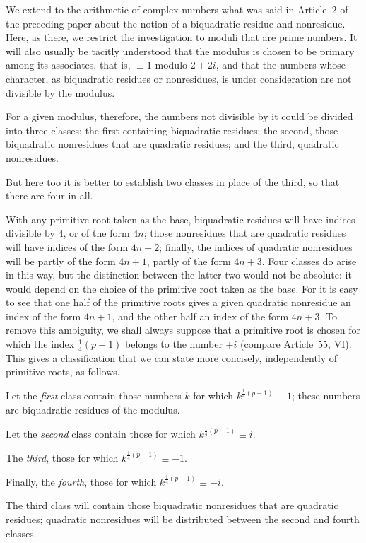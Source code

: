 \newpage
{}
We extend to the arithmetic of complex numbers what was said in Article~2 of the preceding paper about the notion of a biquadratic residue and nonresidue. Here, as there, we restrict the investigation to moduli that are prime numbers. It will also usually be tacitly understood that the modulus is chosen to be primary among its associates, that is, $\equiv1$ modulo $2+2i$, and that the numbers whose character, as biquadratic residues or nonresidues, is under consideration are not divisible by the modulus.

For a given modulus, therefore, the numbers not divisible by it could be divided into three classes: the first containing biquadratic residues; the second, those biquadratic nonresidues that are quadratic residues; and the third, quadratic nonresidues.

%
But here too it is better to establish two classes in place of the third, so that there are four in all.

With any primitive root taken as the base, biquadratic residues will have indices divisible by $4$, or of the form $4n$; those nonresidues that are quadratic residues will have indices of the form $4n+2$; finally, the indices of quadratic nonresidues will be partly of the form $4n+1$, partly of the form $4n+3$. Four classes do arise in this way, but the distinction between the latter two would not be absolute: it would depend on the choice of the primitive root taken as the base. For it is easy to see that one half of the primitive roots gives a given quadratic nonresidue an index of the form $4n+1$, and the other half an index of the form $4n+3$. To remove this ambiguity, we shall always suppose that a primitive root is chosen for which the index $\frac14(p-1)$ belongs to the number $+i$ (compare Article~55, VI). This gives a classification that we can state more concisely, independently of primitive roots, as follows.

Let the \emph{first} class contain those numbers $k$ for which $k^{\frac14(p-1)}\equiv1$; these numbers are biquadratic residues of the modulus.

Let the \emph{second} class contain those for which $k^{\frac14(p-1)}\equiv i$.

The \emph{third}, those for which $k^{\frac14(p-1)}\equiv-1$.

Finally, the \emph{fourth}, those for which $k^{\frac14(p-1)}\equiv-i$.

The third class will contain those biquadratic nonresidues that are quadratic residues; quadratic nonresidues will be distributed between the second and fourth classes.

